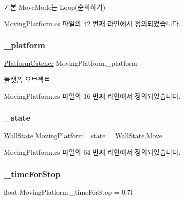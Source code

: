 기본 Move\+Mode는 Loop(순회하기) 



Moving\+Platform.\+cs 파일의 42 번째 라인에서 정의되었습니다.

\mbox{\label{class_moving_platform_a2269ebd689de9ad6368f64b6b14cecb6}} 
\subsubsection{\texorpdfstring{\_platform}{\_platform}}
{\footnotesize\ttfamily \mbox{\hyperlink{class_platform_catcher}{Platform\+Catcher}} Moving\+Platform.\+\_\+platform}



플랫폼 오브젝트 



Moving\+Platform.\+cs 파일의 16 번째 라인에서 정의되었습니다.

\mbox{\label{class_moving_platform_abd03a1d4800fd5fa8ab4ef8ce5a688db}} 
\subsubsection{\texorpdfstring{\_state}{\_state}}
{\footnotesize\ttfamily \mbox{\hyperlink{class_moving_platform_ac47e764b71989317aab0bad26d82a901}{Wall\+State}} Moving\+Platform.\+\_\+state = \mbox{\hyperlink{class_moving_platform_ac47e764b71989317aab0bad26d82a901a6bc362dbf494c61ea117fe3c71ca48a5}{Wall\+State.\+Move}}\hspace{0.3cm}{\ttfamily [private]}}



Moving\+Platform.\+cs 파일의 64 번째 라인에서 정의되었습니다.

\mbox{\label{class_moving_platform_a69791dc347a05d5513e82cd445640cf4}} 
\subsubsection{\texorpdfstring{\_timeForStop}{\_timeForStop}}
{\footnotesize\ttfamily float Moving\+Platform.\+\_\+time\+For\+Stop = 0.\+7f\hspace{0.3cm}{\ttfamily [private]}}



